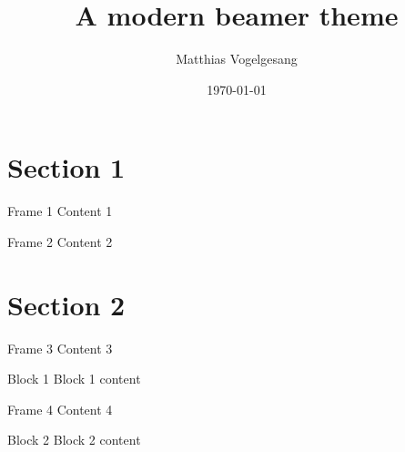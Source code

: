 \documentclass[10pt]{beamer}
\title{A modern beamer theme}
\subtitle{}
\date{\today}
\author{Matthias Vogelgesang}
\institute{Institute or miscellaneous information}
\begin{document}
\maketitle

\section{Section 1}

\begin{frame}{Frame 1}
  Content 1
\end{frame}

\begin{frame}{Frame 2}
  Content 2
\end{frame}

\section{Section 2}

\begin{frame}{Frame 3}
  Content 3
  \begin{block}{Block 1}
    Block 1 content
  \end{block}
\end{frame}

\begin{frame}{Frame 4}
  Content 4
  \begin{block}{Block 2}
    Block 2 content
  \end{block}
\end{frame}
\end{document}
